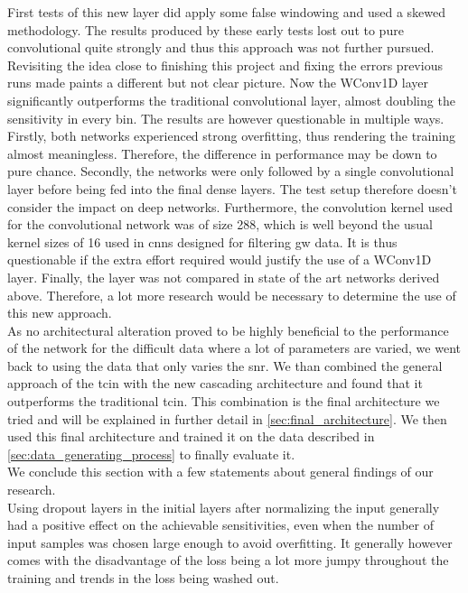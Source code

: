 First tests of this new layer did apply some false windowing and used a skewed methodology. The results produced by these early tests lost out to pure convolutional quite strongly and thus this approach was not further pursued. Revisiting the idea close to finishing this project and fixing the errors previous runs made paints a different but not clear picture. Now the WConv1D layer significantly outperforms the traditional convolutional layer, almost doubling the sensitivity in every bin. The results are however questionable in multiple ways. Firstly, both networks experienced strong overfitting, thus rendering the training almost meaningless. Therefore, the difference in performance may be down to pure chance. Secondly, the networks were only followed by a single convolutional layer before being fed into the final dense layers. The test setup therefore doesn't consider the impact on deep networks. Furthermore, the convolution kernel used for the convolutional network was of size 288, which is well beyond the usual kernel sizes of 16 used in \gls{cnn}s designed for filtering \gls{gw} data. It is thus questionable if the extra effort required would justify the use of a WConv1D layer. Finally, the layer was not compared in state of the art networks derived above. Therefore, a lot more research would be necessary to determine the use of this new approach.\medskip\\
As no architectural alteration proved to be highly beneficial to the performance of the network for the difficult data where a lot of parameters are varied, we went back to using the data that only varies the \gls{snr}. We than combined the general approach of the \gls{tcin} with the new cascading architecture and found that it outperforms the traditional \gls{tcin}. This combination is the final architecture we tried and will be explained in further detail in \autoref{sec:final_architecture}. We then used this final architecture and trained it on the data described in \autoref{sec:data_generating_process} to finally evaluate it.\medskip\\
We conclude this section with a few statements about general findings of our research.\\
Using dropout layers in the initial layers after normalizing the input generally had a positive effect on the achievable sensitivities, even when the number of input samples was chosen large enough to avoid overfitting. It generally however comes with the disadvantage of the loss being a lot more jumpy throughout the training and trends in the loss being washed out.\\
